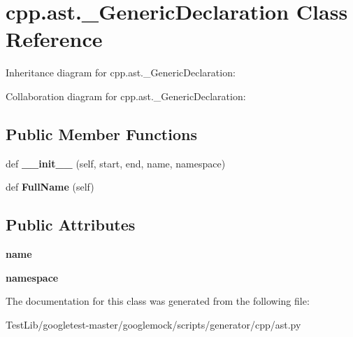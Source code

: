 \hypertarget{classcpp_1_1ast_1_1__GenericDeclaration}{}\section{cpp.\+ast.\+\_\+\+Generic\+Declaration Class Reference}
\label{classcpp_1_1ast_1_1__GenericDeclaration}


Inheritance diagram for cpp.\+ast.\+\_\+\+Generic\+Declaration\+:


Collaboration diagram for cpp.\+ast.\+\_\+\+Generic\+Declaration\+:
\subsection*{Public Member Functions}
\begin{DoxyCompactItemize}
\item 
\mbox{\label{classcpp_1_1ast_1_1__GenericDeclaration_afde72751e20708a7802eb7707d23bc3c}} 
def {\bfseries \+\_\+\+\_\+init\+\_\+\+\_\+} (self, start, end, name, namespace)
\item 
\mbox{\label{classcpp_1_1ast_1_1__GenericDeclaration_a1437d31271ea8cda62da22e2ce427a85}} 
def {\bfseries Full\+Name} (self)
\end{DoxyCompactItemize}
\subsection*{Public Attributes}
\begin{DoxyCompactItemize}
\item 
\mbox{\label{classcpp_1_1ast_1_1__GenericDeclaration_af774f4729dfd78d0538a6782fe8514c1}} 
{\bfseries name}
\item 
\mbox{\label{classcpp_1_1ast_1_1__GenericDeclaration_a8aee3f11b37449d54b42a78e0a689f46}} 
{\bfseries namespace}
\end{DoxyCompactItemize}


The documentation for this class was generated from the following file\+:\begin{DoxyCompactItemize}
\item 
Test\+Lib/googletest-\/master/googlemock/scripts/generator/cpp/ast.\+py\end{DoxyCompactItemize}
